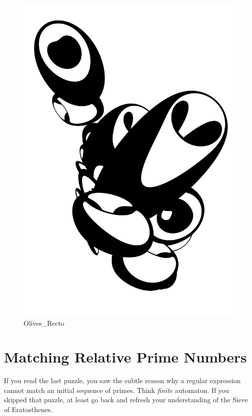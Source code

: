 \begin{figure}
\centering
\includegraphics{images/Olives_Recto.png}
\caption{Olives\_Recto}
\end{figure}

\newpage

\hypertarget{matching-relative-prime-numbers}{%
\section{Matching Relative Prime
Numbers}\label{matching-relative-prime-numbers}}

If you read the last puzzle, you saw the subtle reason why a regular
expression cannot match an initial sequence of primes. Think
\emph{finite} automaton. If you skipped that puzzle, at least go back
and refresh your understanding of the Sieve of Eratosthenes.


